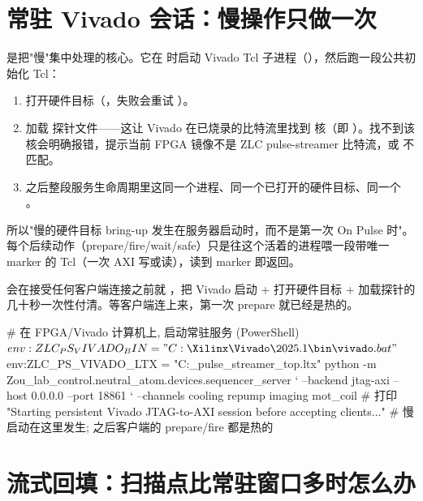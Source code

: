 \documentclass[11pt,oneside,openany]{book}
\begin{document}
\section{常驻 Vivado 会话：慢操作只做一次}

 是把"慢"集中处理的核心。它在  时启动 Vivado Tcl 子进程（），然后跑一段公共初始化 Tcl：

\begin{enumerate}
\item 打开硬件目标（，失败会重试 ）。
\item 加载  探针文件——这让 Vivado 在已烧录的比特流里找到  核（即 ）。找不到该核会明确报错，提示当前 FPGA 镜像不是 ZLC pulse-streamer 比特流，或  不匹配。
\item 之后整段服务生命周期里这同一个进程、同一个已打开的硬件目标、同一个 。
\end{enumerate}

所以"慢的硬件目标 bring-up 发生在服务器启动时，而不是第一次 On Pulse 时"。每个后续动作（prepare/fire/wait/safe）只是往这个活着的进程喂一段带唯一 marker 的 Tcl（一次 AXI 写或读），读到 marker 即返回。

\begin{notebox}
 会在接受任何客户端连接之前就 ，把 Vivado 启动 + 打开硬件目标 + 加载探针的几十秒一次性付清。等客户端连上来，第一次 prepare 就已经是热的。
\end{notebox}

\begin{codeblock}[PowerShell]
# 在 FPGA/Vivado 计算机上, 启动常驻服务 (PowerShell)
$env:ZLC_PS_VIVADO_BIN = "C:\Xilinx\Vivado\2025.1\bin\vivado.bat"
$env:ZLC_PS_VIVADO_LTX = "C:\zlc\zlc_pulse_streamer_top.ltx"
python -m Zou_lab_control.neutral_atom.devices.sequencer_server `
    --backend jtag-axi --host 0.0.0.0 --port 18861 `
    --channels cooling repump imaging mot_coil
# 打印 "Starting persistent Vivado JTAG-to-AXI session before accepting clients..."
# 慢启动在这里发生; 之后客户端的 prepare/fire 都是热的
\end{codeblock}

\section{流式回填：扫描点比常驻窗口多时怎么办}
\end{document}
